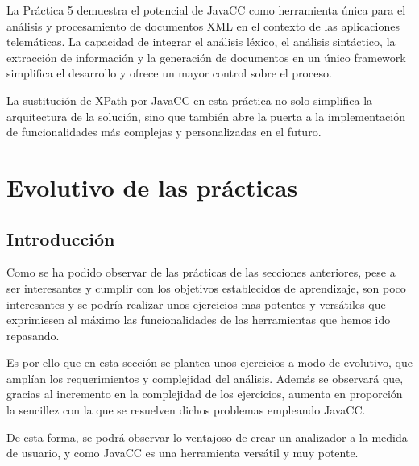 \noindent La Práctica 5 demuestra el potencial de JavaCC como herramienta única para el análisis y procesamiento de documentos XML en el contexto de las aplicaciones telemáticas. La capacidad de integrar el análisis léxico, el análisis sintáctico, la extracción de información y la generación de documentos en un único framework simplifica el desarrollo y ofrece un mayor control sobre el proceso. 



La sustitución de XPath por JavaCC en esta práctica no solo simplifica la arquitectura de la solución, sino que también abre la puerta a la implementación de funcionalidades más complejas y personalizadas en el futuro.

\section{Evolutivo de las prácticas}

\subsection{Introducción}

\noindent Como se ha podido observar de las prácticas de las secciones anteriores, pese a ser interesantes y cumplir con los objetivos establecidos de aprendizaje, son poco interesantes y se podría realizar unos ejercicios mas potentes y versátiles que exprimiesen al máximo las funcionalidades de las herramientas que hemos ido repasando.

Es por ello que en esta sección se plantea unos ejercicios a modo de evolutivo, que amplían los requerimientos y complejidad del análisis. Además se observará que, gracias al incremento en la complejidad de los ejercicios, aumenta en proporción la sencillez con la que se resuelven dichos problemas empleando JavaCC.

De esta forma, se podrá observar lo ventajoso de crear un analizador a la medida de usuario, y como JavaCC es una herramienta versátil y muy potente.

